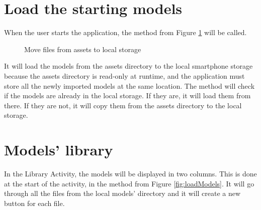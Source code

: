\clearpage

\section{Load the starting models}
When the user starts the application, the method from Figure \ref{fig:tryMoveAssets} will be called.
\begin{figure}[H]
    \centering
    \caption{Move files from assets to local storage}
    \label{fig:tryMoveAssets}
\end{figure}


It will load the models from the assets directory to the local smartphone storage because the assets directory is read-only at runtime, and the application must store all the newly imported models at the same location. The method will check if the models are already in the local storage. If they are, it will load them from there. If they are not, it will copy them from the assets directory to the local storage.

\newpage
\section{Models' library}
In the Library Activity, the models will be displayed in two columns. This is done at the start of the activity, in the method from Figure \ref{fig:loadModels}. It will go through all the files from the local models' directory and it will create a new button for each file.

